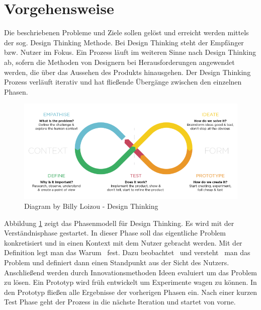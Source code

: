 \section{Vorgehensweise}
Die beschriebenen Probleme und Ziele sollen gelöst und erreicht werden mittels der sog. Design Thinking Methode. Bei Design Thinking steht der Empfänger bzw. Nutzer im Fokus. Ein Prozess läuft im weiteren Sinne nach Design Thinking ab, sofern die Methoden von Designern bei Herausforderungen angewendet werden, die über das Aussehen des Produkts hinausgehen. \cite[vgl.]{Patnaik2009} Der Design Thinking Prozess verläuft iterativ und hat fließende Übergänge zwischen den einzelnen Phasen.

\begin{figure}[h!]
	\centering
	\includegraphics[width=0.9\linewidth]{pictures/Diagram-by-Billy-Loizou-Design-Thinking-blog}
	\caption[Design Thinking Prozess]{Diagram by Billy Loizou - Design Thinking}
	\label{fig:diagram-by-billy-loizou-design-thinking-blog}
\end{figure}

Abbildung \ref{fig:diagram-by-billy-loizou-design-thinking-blog} zeigt das Phasenmodell für Design Thinking. Es wird mit der Verständnisphase gestartet. In dieser Phase soll das eigentliche Problem konkretisiert und in einen Kontext mit dem Nutzer gebracht werden. Mit der Definition legt man das \glqq Warum\grqq~ fest. Dazu \glqq beobachtet\grqq~ und \glqq versteht\grqq~ man das Problem und definiert dann einen Standpunkt aus der Sicht des Nutzers. Anschließend werden durch Innovationsmethoden Ideen evaluiert um das Problem zu lösen. Ein Prototyp wird früh entwickelt um Experimente wagen zu können. In den Prototyp fließen alle Ergebnisse der vorherigen Phasen ein. Nach einer kurzen Test Phase geht der Prozess in die nächste Iteration und startet von vorne.\\

